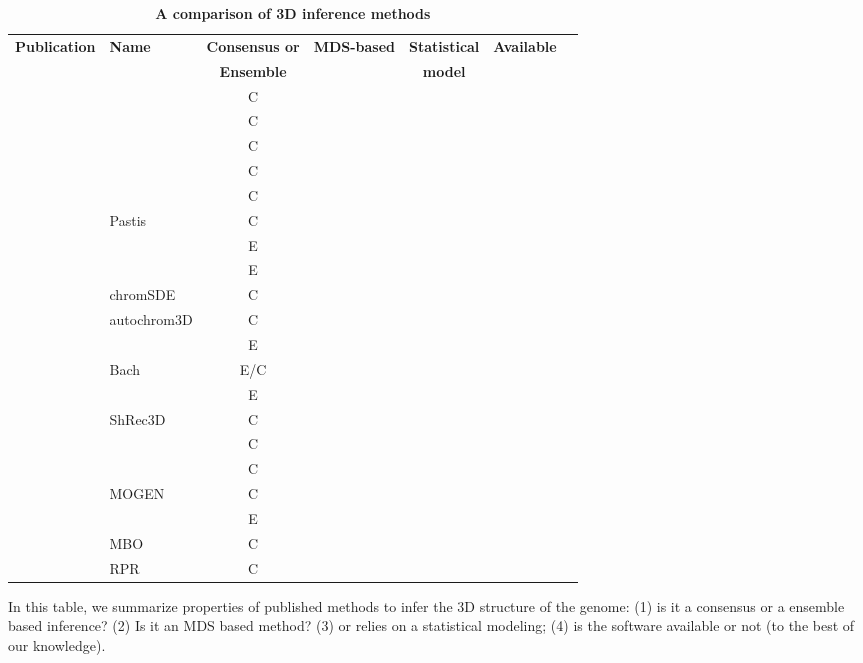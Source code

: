 \documentclass[2columns]{article}
\newcommand*\CHECK{\ding{51}}
\begin{document}
\begin{table}[ht!]
\begin{center}
\scriptsize
\begin{tabular}{rlccccc}
\hline
\multirow{2}{*}{\textbf{\footnotesize Publication}} & \multirow{2}{*}{\textbf{\footnotesize Name}} &
\textbf{\footnotesize Consensus or} 
&\multirow{2}{*}{\textbf{\footnotesize MDS-based}} & \textbf{\footnotesize Statistical} &
\multirow{2}{*}{\textbf{\footnotesize Available}} \\
& & \textbf{\footnotesize Ensemble}
 & & \textbf{\footnotesize model} & \\
\hline
\hline
\scriptsize{\cite{dekker:capturing}} & & C & \CHECK & & \\
\scriptsize{\cite{duan:three-dimensional}} &  & C & \CHECK & & \CHECK \\
\scriptsize{\cite{tanizawa:mapping}} & & C & \CHECK & & \\
\scriptsize{\cite{ay:three-dimensional}} & & C & \CHECK & & \\
\scriptsize{\cite{ben-elazar:spatial}} & & C & \CHECK & & \CHECK \\
\scriptsize{\cite{varoquaux:statistical}} & Pastis & C & & \CHECK & \CHECK\\
\scriptsize{\cite{bau:three-dimensional}} & & E & & &  \\
\scriptsize{\cite{umbarger:three-dimensional}} & & E  & & &\\
\scriptsize{\cite{zhang:inference}} & chromSDE & C &  \CHECK & & \CHECK\\
\scriptsize{\cite{peng:sequencing}} & autochrom3D & C &  \CHECK & & \CHECK\\
\scriptsize{\cite{rousseau:three}} & & E & & \CHECK & \CHECK\\
\scriptsize{\cite{hu:bayesian}} & Bach & E/C &  & \CHECK & \CHECK\\
\scriptsize{\cite{kalhor:genome}} & & E &   & &\\
\scriptsize{\cite{lesne:3d}} & ShRec3D & C  & \CHECK & & \CHECK \\
\scriptsize{\cite{trieu:large}} & & C & & & \\
\scriptsize{\cite{trieu:3D}} & & C & &  & \\
\scriptsize{\cite{trieu:MOGEN}} & MOGEN & C & & & \\
\scriptsize{\cite{nagano:single-cell}} & & E & & & \\
\scriptsize{\cite{paulsen:manifold}} & MBO & C & \CHECK & & \CHECK \\
\scriptsize{\cite{hirata:three-dimensional}} & RPR & C & \CHECK & & \\
\hline
\end{tabular}
\end{center}
\caption{\bf A comparison of 3D inference methods}{\small In this table, we summarize
properties of published methods to infer the 3D structure of the genome: (1)
is it a consensus or a ensemble based inference? (2) Is it an MDS based
method? (3) or relies on a statistical modeling; (4) is the software
available or not (to the best of our knowledge).}
\end{table}
\end{document}
